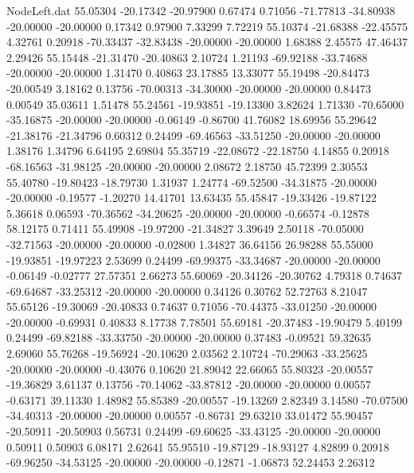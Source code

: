 \begin{filecontents}{NodeLeft.dat}
  55.05304  -20.17342  -20.97900     0.67474    0.71056  -71.77813  -34.80938  -20.00000  -20.00000    0.17342    0.97900    7.33299    7.72219
  55.10374  -21.68388  -22.45575     4.32761    0.20918  -70.33437  -32.83438  -20.00000  -20.00000    1.68388    2.45575   47.46437    2.29426
  55.15448  -21.31470  -20.40863     2.10724    1.21193  -69.92188  -33.74688  -20.00000  -20.00000    1.31470    0.40863   23.17885   13.33077
  55.19498  -20.84473  -20.00549     3.18162    0.13756  -70.00313  -34.30000  -20.00000  -20.00000    0.84473    0.00549   35.03611    1.51478
  55.24561  -19.93851  -19.13300     3.82624    1.71330  -70.65000  -35.16875  -20.00000  -20.00000   -0.06149   -0.86700   41.76082   18.69956
  55.29642  -21.38176  -21.34796     0.60312    0.24499  -69.46563  -33.51250  -20.00000  -20.00000    1.38176    1.34796    6.64195    2.69804
  55.35719  -22.08672  -22.18750     4.14855    0.20918  -68.16563  -31.98125  -20.00000  -20.00000    2.08672    2.18750   45.72399    2.30553
  55.40780  -19.80423  -18.79730     1.31937    1.24774  -69.52500  -34.31875  -20.00000  -20.00000   -0.19577   -1.20270   14.41701   13.63435
  55.45847  -19.33426  -19.87122     5.36618    0.06593  -70.36562  -34.20625  -20.00000  -20.00000   -0.66574   -0.12878   58.12175    0.71411
  55.49908  -19.97200  -21.34827     3.39649    2.50118  -70.05000  -32.71563  -20.00000  -20.00000   -0.02800    1.34827   36.64156   26.98288
  55.55000  -19.93851  -19.97223     2.53699    0.24499  -69.99375  -33.34687  -20.00000  -20.00000   -0.06149   -0.02777   27.57351    2.66273
  55.60069  -20.34126  -20.30762     4.79318    0.74637  -69.64687  -33.25312  -20.00000  -20.00000    0.34126    0.30762   52.72763    8.21047
  55.65126  -19.30069  -20.40833     0.74637    0.71056  -70.44375  -33.01250  -20.00000  -20.00000   -0.69931    0.40833    8.17738    7.78501
  55.69181  -20.37483  -19.90479     5.40199    0.24499  -69.82188  -33.33750  -20.00000  -20.00000    0.37483   -0.09521   59.32635    2.69060
  55.76268  -19.56924  -20.10620     2.03562    2.10724  -70.29063  -33.25625  -20.00000  -20.00000   -0.43076    0.10620   21.89042   22.66065
  55.80323  -20.00557  -19.36829     3.61137    0.13756  -70.14062  -33.87812  -20.00000  -20.00000    0.00557   -0.63171   39.11330    1.48982
  55.85389  -20.00557  -19.13269     2.82349    3.14580  -70.07500  -34.40313  -20.00000  -20.00000    0.00557   -0.86731   29.63210   33.01472
  55.90457  -20.50911  -20.50903     0.56731    0.24499  -69.60625  -33.43125  -20.00000  -20.00000    0.50911    0.50903    6.08171    2.62641
  55.95510  -19.87129  -18.93127     4.82899    0.20918  -69.96250  -34.53125  -20.00000  -20.00000   -0.12871   -1.06873   52.24453    2.26312

\end{filecontents}
